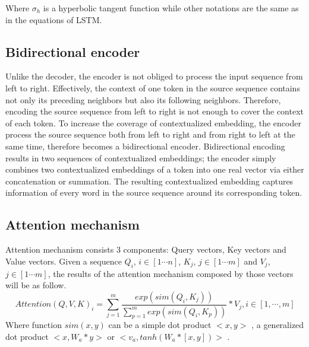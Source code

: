 Where $\sigma_h$ is a hyperbolic tangent function while other notations are the same as in the equations of LSTM.

\subsection{Bidirectional encoder}
Unlike the decoder, the encoder is not obliged to process the input sequence from left to right. Effectively, the context of one token in the source sequence contains not only its preceding neighbors but also its following neighbors. Therefore, encoding the source sequence from left to right is not enough to cover the context of each token. To increase the coverage of contextualized embedding, the encoder process the source sequence both from left to right and from right to left at the same time, therefore becomes a bidirectional encoder. Bidirectional encoding results in two sequences of contextualized embeddings; the encoder simply combines two contextualized embeddings of a token into one real vector via either concatenation or summation. The resulting contextualized embedding captures information of every word in the source sequence around its corresponding token. 

\subsection{Attention mechanism \label{ssec:attention}}
Attention mechanism consists 3 components: Query vectors, Key vectors and Value vectors. Given a sequence $Q_i$, $i \in [1 \cdots n]$, $K_j$, $j \in [1 \cdots m]$ and $V_j$, $j \in [1 \cdots m]$, the results
of the attention mechanism composed by those vectors will be as follow.
\begin{equation}
Attention(Q,V,K)_i = \displaystyle{\mathop{\sum}_{j=1}^{m}} \frac{exp(sim(Q_i,K_j))}{\displaystyle{\mathop{\sum}_{p=1}^{m}}exp(sim(Q_i,K_p))}*V_j, i \in [1, \cdots, m]
\end{equation}
Where function $sim(x,y)$ can be a simple dot product $<x,y>$ \citep{Vaswani17attention}, a generalized dot product $<x,W_a*y>$ or $<v_a,tanh(W_a*[x,y])>$ \citep{Luong15stanford, Bahdanau15learning}.

